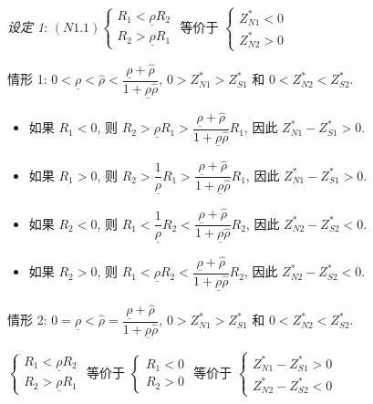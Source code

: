 \documentclass[10.0pt]{article}
\begin{document}
{\it 设定 1}: $ (N1.1) \left\{ \begin{matrix} R_1 < \underline{\rho} R_2 \\ R_2 > \underline{\rho} R_1 \end{matrix} \right. $ 等价于 $ \left\{ \begin{matrix} Z_{N 1}^* < 0 \\ Z_{N 2}^* > 0 \end{matrix} \right. $

情形 1: $ 0 < \underline{\rho} < {\hat \rho} < \dfrac{\underline{\rho} + {\hat \rho}}{1 + \underline{\rho} {\hat \rho}} $, $ 0 > Z_{N 1}^* > Z_{S 1}^* $ 和 $ 0 < Z_{N 2}^* < Z_{S 2}^* $.
\begin{itemize}
\item 如果 $ R_1 < 0 $, 则 $ R_2 > \underline{\rho} R_1 > \dfrac{\underline{\rho} + {\hat \rho}}{1 + \underline{\rho} {\hat \rho}} R_1 $, 因此  $ Z_{N 1}^* - Z_{S 1}^* > 0 $.
\item 如果 $ R_1 > 0 $, 则 $ R_2 > \dfrac{1}{\underline{\rho}} R_1 > \dfrac{\underline{\rho} + {\hat \rho}}{1 + \underline{\rho} {\hat \rho}} R_1 $, 因此 $ Z_{N 1}^* - Z_{S 1}^* > 0 $.
\item 如果 $ R_2 < 0 $, 则 $ R_1 < \dfrac{1}{\underline{\rho}} R_2 < \dfrac{\underline{\rho} + {\hat \rho}}{1 + \underline{\rho} {\hat \rho}} R_2 $, 因此 $ Z_{N 2}^* - Z_{S 2}^* < 0 $.
\item 如果 $ R_2 > 0 $, 则 $ R_1 < \underline{\rho} R_2 < \dfrac{\underline{\rho} + {\hat \rho}}{1 + \underline{\rho} {\hat \rho}} R_2 $, 因此 $ Z_{N 2}^* - Z_{S 2}^* < 0 $.
\end{itemize}

情形 2: $ 0 = \underline{\rho} < {\hat \rho} = \dfrac{\underline{\rho} + {\hat \rho}}{1 + \underline{\rho} {\hat \rho}} $, $ 0 > Z_{N 1}^* > Z_{S 1}^* $ 和 $ 0 < Z_{N 2}^* < Z_{S 2}^* $.

$ \left\{ \begin{matrix} R_1 < \underline{\rho} R_2 \\ R_2 > \underline{\rho} R_1 \end{matrix} \right. $ 等价于 $ \left\{ \begin{matrix} R_1 < 0 \\ R_2 > 0 \end{matrix} \right. $ 等价于 $ \left\{ \begin{matrix} Z_{N 1}^* - Z_{S 1}^* > 0 \\ Z_{N 2}^* - Z_{S 2}^* < 0 \end{matrix} \right. $
\end{document}
